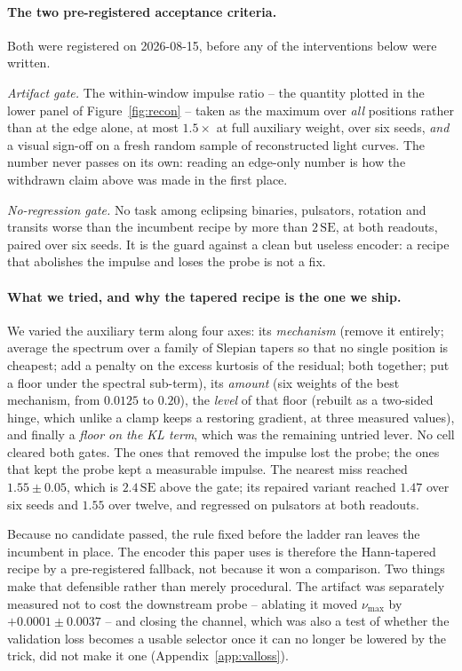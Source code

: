 \documentclass{article}
\begin{document}
\paragraph{The two pre-registered acceptance criteria.} Both were registered on 2026-08-15, before
any of the interventions below were written.

\emph{Artifact gate.} The within-window impulse ratio -- the quantity plotted in the lower panel of
Figure~\ref{fig:recon} -- taken as the maximum over \emph{all} positions rather than at the edge
alone, at most $1.5\times$ at full auxiliary weight, over six seeds, \emph{and} a visual sign-off on
a fresh random sample of reconstructed light curves. The number never passes on its own: reading an
edge-only number is how the withdrawn claim above was made in the first place.

\emph{No-regression gate.} No task among eclipsing binaries, pulsators, rotation and transits worse
than the incumbent recipe by more than $2\,\mathrm{SE}$, at both readouts, paired over six seeds. It
is the guard against a clean but useless encoder: a recipe that abolishes the impulse and loses the
probe is not a fix.

\paragraph{What we tried, and why the tapered recipe is the one we ship.} We varied the auxiliary
term along four axes: its \emph{mechanism} (remove it entirely; average the spectrum over a family of
Slepian tapers so that no single position is cheapest; add a penalty on the excess kurtosis of the
residual; both together; put a floor under the spectral sub-term), its \emph{amount} (six weights of
the best mechanism, from $0.0125$ to $0.20$), the \emph{level} of that floor (rebuilt as a two-sided
hinge, which unlike a clamp keeps a restoring gradient, at three measured values), and finally a
\emph{floor on the KL term}, which was the remaining untried lever. No cell cleared both gates. The
ones that removed the impulse lost the probe; the ones that kept the probe kept a measurable impulse.
The nearest miss reached $1.55 \pm 0.05$, which is $2.4\,\mathrm{SE}$ above the gate; its repaired
variant reached $1.47$ over six seeds and $1.55$ over twelve, and regressed on pulsators at both
readouts.

Because no candidate passed, the rule fixed before the ladder ran leaves the incumbent in place. The
encoder this paper uses is therefore the Hann-tapered recipe by a pre-registered fallback, not
because it won a comparison. Two things make that defensible rather than merely procedural. The
artifact was separately measured not to cost the downstream probe -- ablating it moved $\nu_{\max}$
by $+0.0001 \pm 0.0037$ -- and closing the channel, which was also a test of whether the validation
loss becomes a usable selector once it can no longer be lowered by the trick, did not make it one
(Appendix~\ref{app:valloss}).
\end{document}
